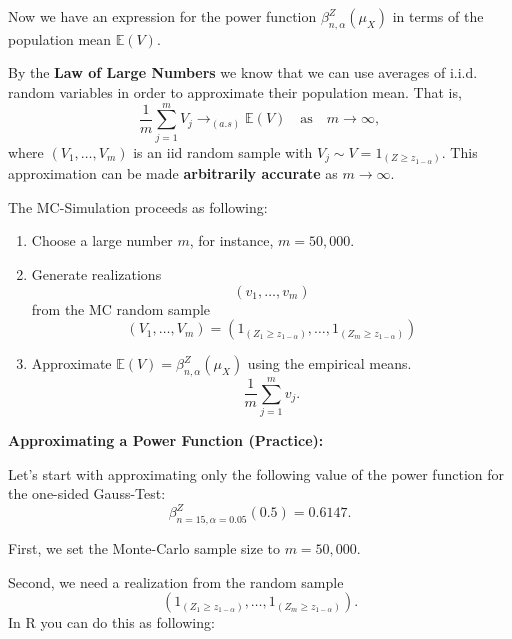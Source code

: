 \documentclass[
]{book}
\providecommand{\tightlist}{%
  \setlength{\itemsep}{0pt}\setlength{\parskip}{0pt}}
\begin{document}
Now we have an expression for the power function \(\beta^{Z}_{n,\alpha}(\mu_X)\) in terms of the population mean \(\mathbb{E}(V)\).

By the \textbf{Law of Large Numbers} we know that we can use averages of i.i.d. random variables in order to approximate their population mean. That is,
\[
\frac{1}{m}\sum_{j=1}^m V_j\to_{(a.s)}\mathbb{E}(V)\quad\text{as}\quad m\to\infty,
\]
where \((V_1,\dots,V_m)\) is an iid random sample with \(V_j\sim V=1_{(Z \geq z_{1-\alpha})}\). This approximation can be made \textbf{arbitrarily accurate} as \(m\to\infty\).

\hfill\break

The MC-Simulation proceeds as following:

\begin{enumerate}
\def\labelenumi{\arabic{enumi}.}
\tightlist
\item
  Choose a large number \(m\), for instance, \(m=50,000\).
\item
  Generate realizations
  \[
   (v_1,\dots,v_m)
   \]
  from the MC random sample
  \[
   (V_1,\dots,V_m)=(1_{(Z_1 \geq z_{1-\alpha})},\dots,1_{(Z_m \geq z_{1-\alpha})})
   \]
\item
  Approximate \(\mathbb{E}(V)=\beta^{Z}_{n,\alpha}(\mu_X)\) using the empirical means.
  \[
   \frac{1}{m}\sum_{j=1}^m v_j.
   \]
\end{enumerate}

\hfill\break

\textbf{Approximating a Power Function (Practice):}

Let's start with approximating only the following value of the power function for the one-sided Gauss-Test:
\[
\beta^{Z}_{n=15,\alpha=0.05}(0.5)=0.6147.
\]

First, we set the Monte-Carlo sample size to \(m=50,000\).

Second, we need a realization from the random sample
\[
(1_{(Z_1 \geq z_{1-\alpha})},\dots,1_{(Z_m \geq z_{1-\alpha})}).
\]
In R you can do this as following:
\end{document}
